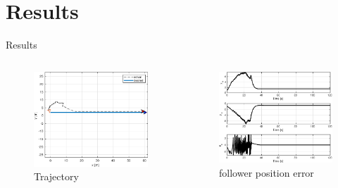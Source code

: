 \documentclass{beamer}
\begin{document}
\section{Results}
\begin{frame}{Results}
\begin{columns}
\begin{column}{0.5\textwidth}
\begin{figure}
\includegraphics[scale=0.4]{figs/matlab/straightLine/trajectory.eps}
\caption{Trajectory}
\end{figure}
\end{column}

\begin{column}{0.5\textwidth}
\begin{center}

\begin{figure}
\includegraphics[scale=0.4]{figs/matlab/straightLine/error.eps}
\caption{follower position error}
\end{figure}
\end{center}

\end{column}

\end{columns}

\end{frame}
\end{document}
